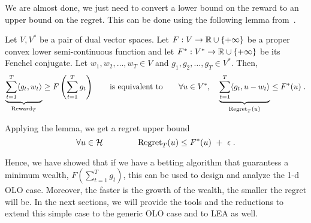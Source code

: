 We are almost done, we just need to convert a lower bound on the reward to an upper bound
on the regret. This can be done using the following lemma from~\cite{McMahan-Orabona-2014}.
\begin{lemma}
\label{lemma:reward-regret}
Let $V,V^*$ be a pair of dual vector spaces. Let $F:V \to \mathbb{R} \cup \{+\infty\}$
be a proper convex lower semi-continuous function and let $F^*:V^* \to \mathbb{R} \cup
\{+\infty\}$ be its Fenchel conjugate. Let $w_1, w_2, \dots, w_T \in V$ and
$g_1, g_2, \dots, g_T \in V^*$.  Then,
\[
\underbrace{\sum_{t=1}^T \langle g_t, w_t \rangle}_{\operatorname{Reward}_T} \ge F\left( \sum_{t=1}^T g_t \right)
\qquad \text{is equivalent to} \qquad
\forall u \in V^*, \quad
\underbrace{\sum_{t=1}^T \langle g_t, u - w_t\rangle}_{\operatorname{Regret}_T(u)} \le F^*(u) \; .
\]
\end{lemma}

Applying the lemma, we get a regret upper bound
\[
\forall u \in \mathcal{H} \qquad \qquad
\operatorname{Regret}_T(u) \le F^*(u) \ + \ \epsilon \; .
\]

Hence, we have showed that if we have a betting algorithm that guarantess a minimum wealth, $F(\sum_{t=1}^T g_t)$, this can be used to design and analyze the 1-d \ac{OLO} case. Moreover, the faster is the growth of the wealth, the smaller the regret will be.
In the next sections, we will provide the tools and the reductions to extend this simple case to the generic \ac{OLO} case and to \ac{LEA} as well.
